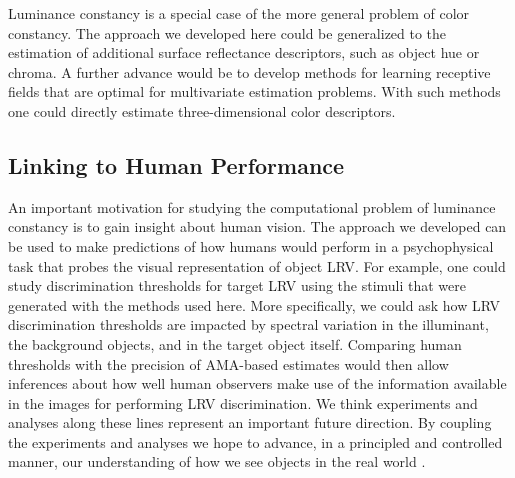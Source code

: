 \documentclass{jov}
\begin{document}
Luminance constancy is a special case of the more general problem of color constancy.
The approach we developed here could be generalized to the estimation of additional surface reflectance descriptors, such as object hue or chroma.
A further advance would be to develop methods for learning receptive fields that are optimal for multivariate estimation problems. 
With such methods one could directly estimate three-dimensional color descriptors.

\subsection{Linking to Human Performance}

An important motivation for studying the computational problem of luminance constancy
is to gain insight about human vision.
The approach we developed can be used to make predictions of how humans would perform in a psychophysical task that probes the visual representation of object LRV.
For example, one could study discrimination thresholds for target LRV using the stimuli that were generated with the methods used here.
More specifically, we could ask how LRV discrimination thresholds are impacted by spectral variation in the illuminant, the background objects, and in the target object itself.
Comparing human thresholds with the precision of AMA-based estimates would then allow inferences about how well human observers make use of the information available in the images for performing LRV discrimination.
We think experiments and analyses along these lines represent an important future direction.
By coupling the experiments and analyses we hope to advance, in a principled and controlled manner, our understanding of how we see objects in the real world .



\end{document}
